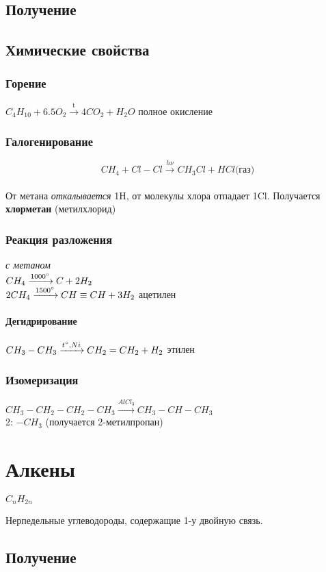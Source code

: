 \documentclass[a4paper]{article}
\begin{document}
\subsection{Получение}
\subsection{Химические свойства}
	\subsubsection{Горение}
	$C_{4}H_{10}+6.5O_{2}  \xrightarrow{\text{t}} 4CO_{2}+H_{2}O$
	полное окисление
	\subsubsection{Галогенирование}
	$$CH_{4}+Cl-Cl \xrightarrow{h\nu} CH_{3}Cl+HCl \text{(газ)}$$\\
	От метана \textit{откалывается} 1H, от молекулы хлора отпадает 1Cl.
	Получается \textbf{хлорметан} (метилхлорид)
	\subsubsection{Реакция разложения}
	\textit{с метаном}\\
	$CH_{4} \xrightarrow{1000 \degree} C+2H_2$\\
	$2CH_{4} \xrightarrow{1500 \degree} CH \equiv CH+3H_{2}$ ацетилен\\
	\paragraph{Дегидрирование}
	$CH_{3}-CH_{3} \xrightarrow{t \degree,Ni} CH_{2}=CH_{2}+H_{2}$ этилен
	\subsubsection{Изомеризация}
	$CH_{3}-CH_{2}-CH_{2}-CH_{3} \xrightarrow{AlCl_{3}} CH_3-CH-CH_{3}$\\
	2: $-CH_{3}$ (получается 2-метилпропан)
\pagebreak

\section{Алкены} \begin{flushright} $C_{n}H_{2n}$ \end{flushright}
Нерпедельные углеводороды, содержащие 1-у двойную связь.
\subsection{Получение}
\end{document}
